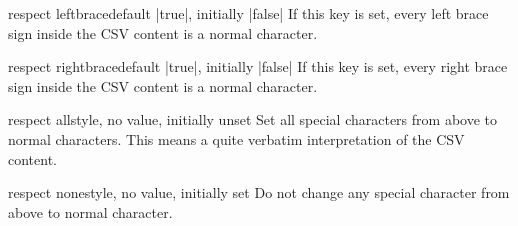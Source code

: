 \documentclass[a4paper,11pt]{ltxdoc}
\begin{document}
\begin{docCsvKey}{respect leftbrace}{}{default |true|, initially |false|}
  If this key is set, every
  left brace sign \verbbox{\textbraceleft}
  inside the CSV content is a normal character.
\end{docCsvKey}

\begin{docCsvKey}{respect rightbrace}{}{default |true|, initially |false|}
  If this key is set, every
  right brace sign \verbbox{\textbraceright}
  inside the CSV content is a normal character.
\end{docCsvKey}

\begin{docCsvKey}{respect all}{}{style, no value, initially unset}
  Set all special characters from above to normal characters. This means
  a quite verbatim interpretation of the CSV content.
\end{docCsvKey}

\begin{docCsvKey}{respect none}{}{style, no value, initially set}
  Do not change any special character from above to normal character.
\end{docCsvKey}

\clearpage
\end{document}
